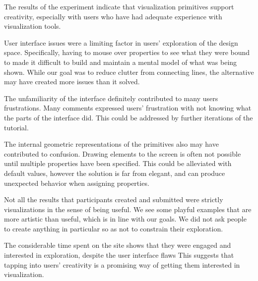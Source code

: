 \label{discussion}

The results of the experiment indicate that visualization primitives support creativity, especially with users who have had adequate experience with visualization tools.

User interface issues were a limiting factor in users' exploration of the design space.
Specifically, having to mouse over properties to see what they were bound to made it difficult to build and maintain a mental model of what was being shown.
While our goal was to reduce clutter from connecting lines, the alternative may have created more issues than it solved.

The unfamiliarity of the interface definitely contributed to many users frustrations.
Many comments expressed users' frustration with not knowing what the parts of the interface did.
This could be addressed by further iterations of the tutorial.

The internal geometric representations of the primitives also may have contributed to confusion.
Drawing elements to the screen is often not possible until multiple properties have been specified.
This could be alleviated with default values, however the solution is far from elegant, and can produce unexpected behavior when assigning properties.

Not all the results that participants created and submitted were strictly visualizations in the sense of being useful. We see some playful examples that are more artistic than useful, which is in line with our goals. We did not ask people to create anything in particular so as not to constrain their exploration.

The considerable time spent on the site shows that they were engaged and interested in exploration, despite the user interface flaws This suggests that tapping into users' creativity is a promising way of getting them interested in visualization.